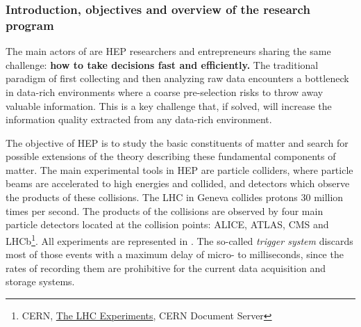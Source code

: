 
\subsubsection{Introduction, objectives and overview of the research program}
\label{sec:introRO}

The main actors of \acronym are HEP researchers and entrepreneurs sharing the same challenge: \textbf{how to take decisions fast and efficiently.}
The traditional paradigm of first collecting and then analyzing raw data encounters a bottleneck in data-rich environments where a coarse pre-selection risks to throw away valuable information.
This is a key challenge that, if solved, will increase the information quality extracted from any data-rich environment. 

The objective of HEP is to study the basic constituents of matter and search for possible extensions of the theory describing these fundamental components of matter. 
The main experimental tools in HEP are particle colliders, where particle beams are accelerated to high energies and collided, and detectors which observe the products
of these collisions. 
The LHC in Geneva collides protons 30 million times per second.
The products of the collisions are observed by four main particle detectors located at the collision points: ALICE, ATLAS, CMS and LHCb\footnote{CERN, \href{http://cds.cern.ch/record/1997374}{The LHC Experiments}, CERN Document Server}.
All experiments are represented in \acronym. 
The so-called \textit{trigger system} discards most of those events with a maximum delay of micro- to milliseconds, since the rates of recording them are prohibitive for the current data acquisition and storage systems. 


